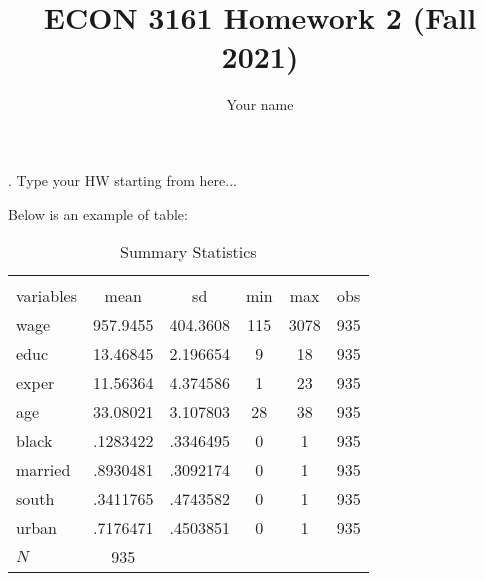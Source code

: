 \documentclass[11 pt, a4paper]{article}
\begin{document}
\title{{ECON 3161 Homework 2 (Fall 2021)}}
\author{Your name}
\date{}
\maketitle
{}. Type your  HW starting from here...
    

Below is an example of table:   
\begin{table}[htbp]\centering
\def\sym#1{\ifmmode^{#1}\else\(^{#1}\)\fi}
\caption{Summary Statistics}
\begin{tabular}{l*{1}{ccccc}}
\hline\hline
                                             \\
 variables       &        mean&          sd&         min&         max&       obs\\
\hline
wage        &    957.9455&    404.3608&         115&        3078&         935\\
educ        &    13.46845&    2.196654&           9&          18&         935\\
exper       &    11.56364&    4.374586&           1&          23&         935\\
age         &    33.08021&    3.107803&          28&          38&         935\\
black       &    .1283422&    .3346495&           0&           1&         935\\
married     &    .8930481&    .3092174&           0&           1&         935\\
south       &    .3411765&    .4743582&           0&           1&         935\\
urban       &    .7176471&    .4503851&           0&           1&         935\\
\hline
\(N\)       &         935&            &            &            &            \\
\hline\hline
\end{tabular}
\end{table}
\end{document}
